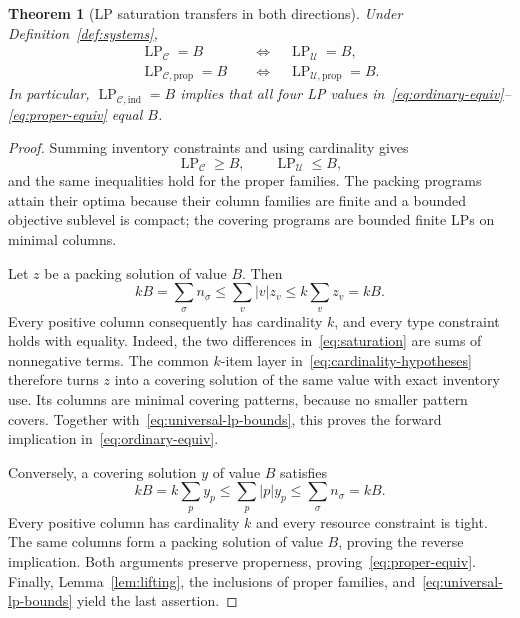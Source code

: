 \documentclass[11pt,a4paper]{article}
\newtheorem{theorem}{Theorem}
\theoremstyle{definition}
\theoremstyle{remark}
\newcommand{\LP}{\operatorname{LP}}
\newcommand{\cC}{\mathcal C}
\newcommand{\cU}{\mathcal U}
\begin{document}
\begin{theorem}[LP saturation transfers in both directions]\label{thm:lp-transfer}
Under Definition~\ref{def:systems},
\begin{align}
 \LP_{\cC}=B&\quad\Longleftrightarrow\quad\LP_{\cU}=B,\label{eq:ordinary-equiv}\\
 \LP_{\cC,\mathrm{prop}}=B&\quad\Longleftrightarrow\quad\LP_{\cU,\mathrm{prop}}=B.\label{eq:proper-equiv}
\end{align}
In particular, $\LP_{\cC,\mathrm{ind}}=B$ implies that all four LP values in~\eqref{eq:ordinary-equiv}--\eqref{eq:proper-equiv} equal $B$.
\end{theorem}
\begin{proof}
Summing inventory constraints and using cardinality gives
\begin{equation}\label{eq:universal-lp-bounds}
 \LP_{\cC}\ge B,\qquad \LP_{\cU}\le B,
\end{equation}
and the same inequalities hold for the proper families. The packing programs attain their optima because their column families are finite and a bounded objective sublevel is compact; the covering programs are bounded finite LPs on minimal columns.

Let $z$ be a packing solution of value $B$. Then
\begin{equation}\label{eq:saturation}
 kB=\sum_\sigma n_\sigma
 \le\sum_v|v|z_v
 \le k\sum_vz_v=kB.
\end{equation}
Every positive column consequently has cardinality $k$, and every type constraint holds with equality. Indeed, the two differences in~\eqref{eq:saturation} are sums of nonnegative terms. The common $k$-item layer in~\eqref{eq:cardinality-hypotheses} therefore turns $z$ into a covering solution of the same value with exact inventory use. Its columns are minimal covering patterns, because no smaller pattern covers. Together with~\eqref{eq:universal-lp-bounds}, this proves the forward implication in~\eqref{eq:ordinary-equiv}.

Conversely, a covering solution $y$ of value $B$ satisfies
\[
 kB=k\sum_py_p\le\sum_p|p|y_p\le\sum_\sigma n_\sigma=kB.
\]
Every positive column has cardinality $k$ and every resource constraint is tight. The same columns form a packing solution of value $B$, proving the reverse implication. Both arguments preserve properness, proving~\eqref{eq:proper-equiv}. Finally, Lemma~\ref{lem:lifting}, the inclusions of proper families, and~\eqref{eq:universal-lp-bounds} yield the last assertion.
\end{proof}
\end{document}
